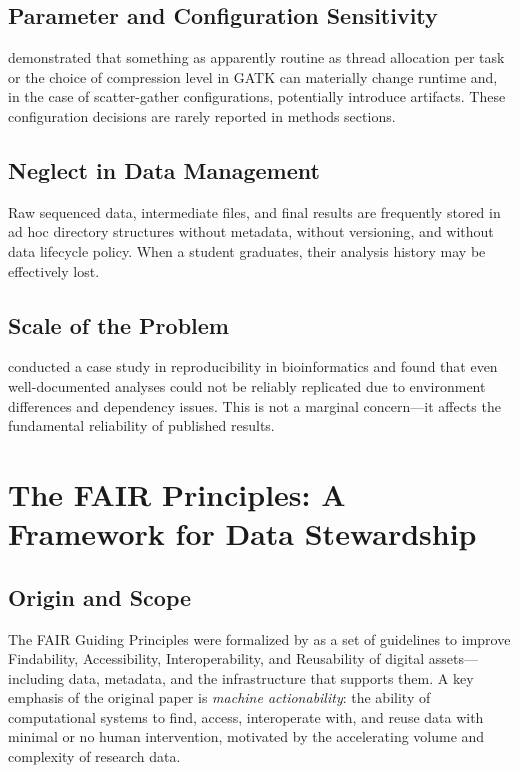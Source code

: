 \subsection{Parameter and Configuration Sensitivity}

\textcite{powers2022} demonstrated that something as apparently routine as thread allocation per task or the choice of compression level in GATK can materially change runtime and, in the case of scatter-gather configurations, potentially introduce artifacts. These configuration decisions are rarely reported in methods sections.

\subsection{Neglect in Data Management}

Raw sequenced data, intermediate files, and final results are frequently stored in ad hoc directory structures without metadata, without versioning, and without data lifecycle policy. When a student graduates, their analysis history may be effectively lost.

\subsection{Scale of the Problem}

\textcite{kim2018} conducted a case study in reproducibility in bioinformatics and found that even well-documented analyses could not be reliably replicated due to environment differences and dependency issues. This is not a marginal concern---it affects the fundamental reliability of published results.

\section{The FAIR Principles: A Framework for Data Stewardship}

\subsection{Origin and Scope}

The FAIR Guiding Principles were formalized by \textcite{wilkinson2016} as a set of guidelines to improve Findability, Accessibility, Interoperability, and Reusability of digital assets---including data, metadata, and the infrastructure that supports them. A key emphasis of the original paper is \textit{machine actionability}: the ability of computational systems to find, access, interoperate with, and reuse data with minimal or no human intervention, motivated by the accelerating volume and complexity of research data.

